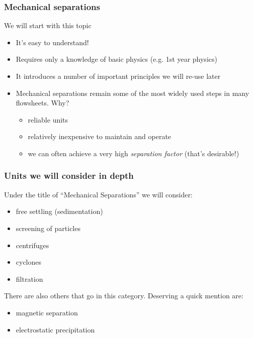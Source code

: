 
\begin{frame}\frametitle{Mechanical separations}
	We will start with this topic
	\begin{itemize}
		\item	It's easy to understand!
		\item	Requires only a knowledge of basic physics (e.g. 1st year physics)
		\item	It introduces a number of important principles we will re-use later
		\item	Mechanical separations remain some of the most widely used steps in many flowsheets. Why?
		\begin{itemize}
			\item	reliable units
			\item	relatively inexpensive to maintain and operate
			\item	we can often achieve a very high \emph{separation factor} (that's desirable!)
		\end{itemize}
	\end{itemize}
\end{frame}

\begin{frame}\frametitle{Units we will consider in depth}
	Under the title of ``Mechanical Separations'' we will consider:
	\begin{itemize}
		\item	free settling (sedimentation)
		\item	screening of particles 
		\item	centrifuges
		\item	cyclones
		\item	filtration
	\end{itemize}
	
	\vspace{12pt}
	There are also others that go in this category. Deserving a quick mention are:
	\begin{itemize}
		\item	magnetic separation
		\item	electrostatic precipitation
	\end{itemize}
\end{frame}

